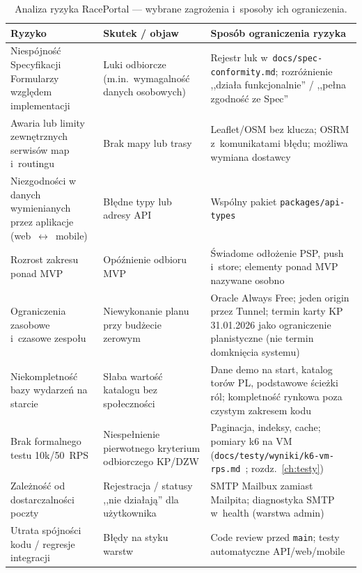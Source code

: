 \documentclass{sprz}
\begin{document}
\begin{table}[ht]
  \centering
  \caption{Analiza ryzyka RacePortal --- wybrane zagrożenia i~sposoby ich ograniczenia.}
  \label{tab:ryzyka}
  {\footnotesize
  \renewcommand{\arraystretch}{1.05}
  \begin{tabularx}{\linewidth}{|>{\raggedright\arraybackslash}X|>{\raggedright\arraybackslash}X|>{\raggedright\arraybackslash}X|}
    \hline
    \textbf{Ryzyko} & \textbf{Skutek / objaw} & \textbf{Sposób ograniczenia ryzyka} \\
    \hline
    Niespójność Specyfikacji Formularzy względem implementacji & Luki odbiorcze (m.in.\ wymagalność danych osobowych) & Rejestr luk w~\texttt{docs/\allowbreak spec-\allowbreak conformity.md}; rozróżnienie ,,działa funkcjonalnie'' / ,,pełna zgodność ze Spec'' \\
    \hline
    Awaria lub limity zewnętrznych serwisów map i~routingu & Brak mapy lub trasy & Leaflet/OSM bez klucza; OSRM z~komunikatami błędu; możliwa wymiana dostawcy \\
    \hline
    Niezgodności w danych wymienianych przez aplikacje (web~$\leftrightarrow$~mobile) & Błędne typy lub adresy API & Wspólny pakiet \texttt{packages/\allowbreak api-\allowbreak types} \\
    \hline
    Rozrost zakresu ponad MVP & Opóźnienie odbioru MVP & Świadome odłożenie PSP, push i~store; elementy ponad MVP nazywane osobno \\
    \hline
    Ograniczenia zasobowe i~czasowe zespołu & Niewykonanie planu przy budżecie zerowym & Oracle Always Free; jeden origin przez Tunnel; termin karty KP 31.01.2026 jako ograniczenie planistyczne (nie termin domknięcia systemu) \\
    \hline
    Niekompletność bazy wydarzeń na starcie & Słaba wartość katalogu bez społeczności & Dane demo na start, katalog torów PL, podstawowe ścieżki ról; kompletność rynkowa poza czystym zakresem kodu \\
    \hline
    Brak formalnego testu 10k/50~RPS & Niespełnienie pierwotnego kryterium odbiorczego KP/DZW & Paginacja, indeksy, cache; pomiary k6 na VM (\texttt{docs/\allowbreak testy/\allowbreak wyniki/\allowbreak k6-vm-rps.md}~\cite{k6:vm-rps}; rozdz.~\ref{ch:testy}) \\
    \hline
    Zależność od dostarczalności poczty & Rejestracja / statusy ,,nie działają'' dla użytkownika & SMTP Mailbux zamiast Mailpita; diagnostyka SMTP w~health (warstwa admin) \\
    \hline
    Utrata spójności kodu / regresje integracji & Błędy na styku warstw & Code review przed \texttt{main}; testy automatyczne API/web/mobile \\
    \hline
  \end{tabularx}
  }
\end{table}
\end{document}

